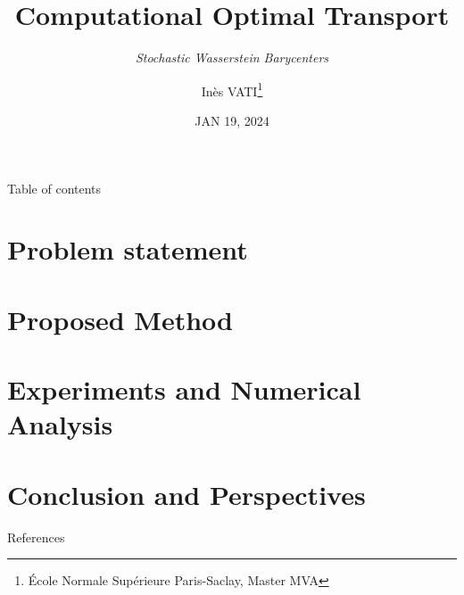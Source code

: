 \documentclass[hyperref={pdftex}]{beamer}
\title{Computational Optimal Transport}
\subtitle{\textit{Stochastic Wasserstein Barycenters}}
\author{Inès VATI\thanks{École Normale Supérieure Paris-Saclay, Master MVA}} %
\institute[MVA]{\texttt{[image: figures/mva logo.png]}}
\date{ JAN 19, 2024 } %
\begin{document}
\begin{frame}[plain]
  \titlepage
\end{frame}    

\begin{frame}{Table of contents}
  \tableofcontents
\end{frame}

\section{Problem statement}


\section{Proposed Method}



\section{Experiments and Numerical Analysis}


\section{Conclusion and Perspectives}


\begin{frame}{References}
    \printbibliography
\end{frame}
\end{document}
